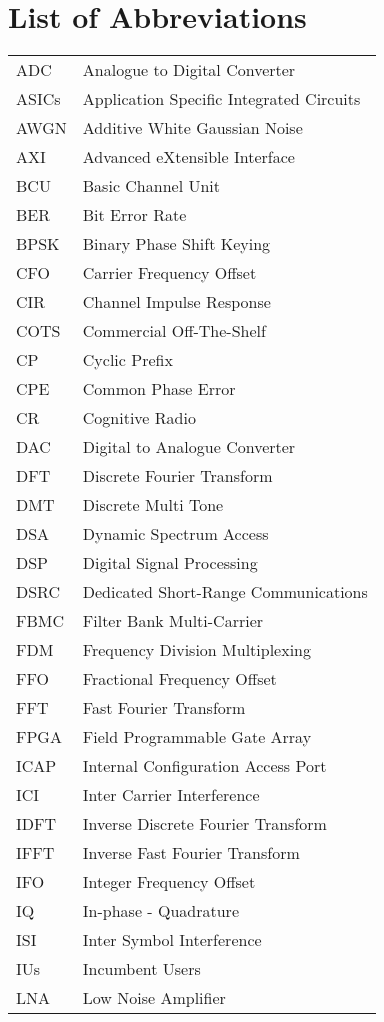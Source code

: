 \chapter* {List of Abbreviations}
\begin{tabular}{p{100pt}l}
ADC & Analogue to Digital Converter   \\
ASICs & Application Specific Integrated Circuits   \\
AWGN & Additive White Gaussian Noise   \\
AXI  & Advanced eXtensible Interface \\
BCU & Basic Channel Unit   \\
BER & Bit Error Rate   \\
BPSK & Binary Phase Shift Keying   \\
CFO & Carrier Frequency Offset   \\
CIR & Channel Impulse Response   \\
COTS & Commercial Off-The-Shelf   \\
CP & Cyclic Prefix   \\
CPE & Common Phase Error   \\
CR & Cognitive Radio   \\
DAC & Digital to Analogue Converter   \\
DFT & Discrete Fourier Transform   \\
DMT & Discrete Multi Tone   \\
DSA & Dynamic Spectrum Access   \\
DSP & Digital Signal Processing   \\
DSRC & Dedicated Short-Range Communications   \\
FBMC & Filter Bank Multi-Carrier   \\
FDM & Frequency Division Multiplexing   \\
FFO & Fractional Frequency Offset   \\
FFT & Fast Fourier Transform   \\
FPGA & Field Programmable Gate Array   \\
ICAP & Internal Configuration Access Port \\
ICI & Inter Carrier Interference   \\
IDFT & Inverse Discrete Fourier Transform   \\
IFFT & Inverse Fast Fourier Transform   \\
IFO& Integer Frequency Offset   \\
IQ & In-phase - Quadrature   \\
ISI & Inter Symbol Interference   \\
IUs & Incumbent Users   \\
LNA & Low Noise Amplifier   \\
\end{tabular}
